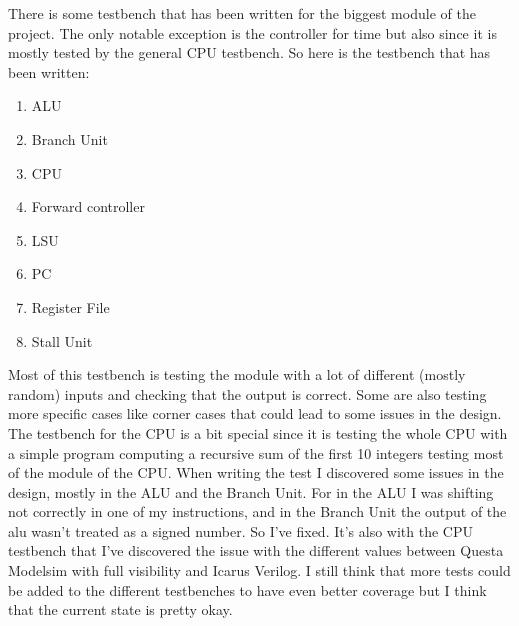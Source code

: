 There is some testbench that has been written for the biggest module of the project. The only notable exception is the 
controller for time but also since it is mostly tested by the general CPU testbench. So here is the testbench that has been written:

\begin{enumerate}[label={\textbullet}]
    \item ALU
    \item Branch Unit
    \item CPU
    \item Forward controller
    \item LSU
    \item PC
    \item Register File
    \item Stall Unit
\end{enumerate}

Most of this testbench is testing the module with a lot of different (mostly random) inputs and checking that the output is correct.
Some are also testing more specific cases like corner cases that could lead to some issues in the design. The testbench for the CPU is 
a bit special since it is testing the whole CPU with a simple program computing a recursive sum of the first 10 integers testing most 
of the module of the CPU.
When writing the test I discovered some issues in the design, mostly in the ALU and the Branch Unit. For in the ALU I was shifting 
not correctly in one of my instructions, and in the Branch Unit the output of the alu wasn't treated as a signed number. So I've fixed.
It's also with the CPU testbench that I've discovered the issue with the different values between Questa Modelsim with full visibility and 
Icarus Verilog. 
I still think that more tests could be added to the different testbenches to have even better coverage but I think that the current
state is pretty okay. 